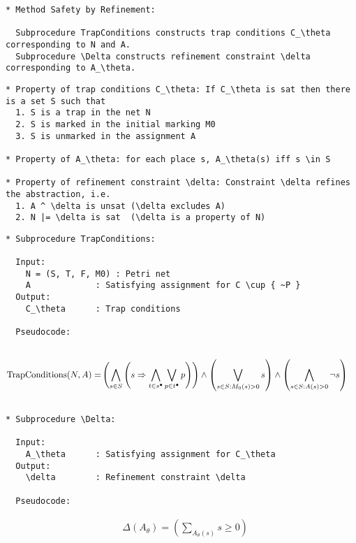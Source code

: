 \iffalse

\begin{verbatim}
* Method Safety by Refinement:

  Subprocedure TrapConditions constructs trap conditions C_\theta corresponding to N and A.
  Subprocedure \Delta constructs refinement constraint \delta corresponding to A_\theta.
\end{verbatim}




\begin{verbatim}
* Property of trap conditions C_\theta: If C_\theta is sat then there is a set S such that
  1. S is a trap in the net N
  2. S is marked in the initial marking M0
  3. S is unmarked in the assignment A

* Property of A_\theta: for each place s, A_\theta(s) iff s \in S

* Property of refinement constraint \delta: Constraint \delta refines the abstraction, i.e.
  1. A ^ \delta is unsat (\delta excludes A)
  2. N |= \delta is sat  (\delta is a property of N)
\end{verbatim}

\newpage

\begin{verbatim}
* Subprocedure TrapConditions:

  Input:
    N = (S, T, F, M0) : Petri net
    A             : Satisfying assignment for C \cup { ~P }
  Output:
    C_\theta      : Trap conditions

  Pseudocode:
  
\end{verbatim}
\begin{align*}
  \text{TrapConditions}(N, A) =& \left(
      \bigwedge_{s \in S} \left( s \Rightarrow
      \bigwedge_{t \in s^{\bullet}} \bigvee_{p \in t^{\bullet}} p
    \right) \right) \land
    \left( \bigvee_{s \in S: M_0(s) > 0} s \right) \land
    \left( \bigwedge_{s \in S: A(s) > 0} \neg s \right)
\end{align*}
\begin{verbatim}

* Subprocedure \Delta:

  Input:
    A_\theta      : Satisfying assignment for C_\theta
  Output:
    \delta        : Refinement constraint \delta

  Pseudocode:

\end{verbatim}
\begin{align*}
  & \Delta(A_\theta) = \left( \sum_{A_\theta(s)} s \ge 0 \right)
\end{align*}

